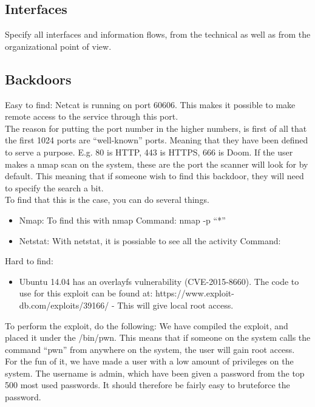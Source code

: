 \documentclass{article}
\begin{document}
\subsection{Interfaces}

Specify  all interfaces and  information flows, from the technical as well as from the
  organizational point of view.

\subsection{Backdoors}
Easy to find: 
Netcat is running on port 60606. This makes it possible to make remote access to the service through this port.\\

The reason for putting the port number in the higher numbers, is first of all that the first 1024 ports are “well-known” ports.  Meaning that they have been defined to serve a purpose. E.g. 80 is HTTP, 443 is HTTPS, 666 is Doom. If the user makes a nmap scan on the system, these are the port the scanner will look for by default. This meaning that if someone wish to find this backdoor, they will need to specify the search a bit.\\

To find that this is the case, you can do several things.
\begin{itemize}
\item Nmap: To find this with nmap 
Command: nmap -p “*”
\item	Netstat: With netstat, it is possiable to see all the activity 
Command:
\end{itemize}

Hard to find: 
\begin{itemize}
\item Ubuntu 14.04 has an overlayfs vulnerability (CVE-2015-8660). The code to use for this exploit can be found at: https://www.exploit-db.com/exploits/39166/ - This will give local root access.
\end{itemize}

To perform the exploit, do the following:
We have compiled the exploit, and placed it under the /bin/pwn. This means that if someone on the system calls the command “pwn” from anywhere on the system, the user will gain root access. \\

For the fun of it, we have made a user with a low amount of privileges on the system. The username is admin, which have been given a password from the top 500 most used passwords. It should therefore be fairly easy to bruteforce the password. \\
\end{document}
